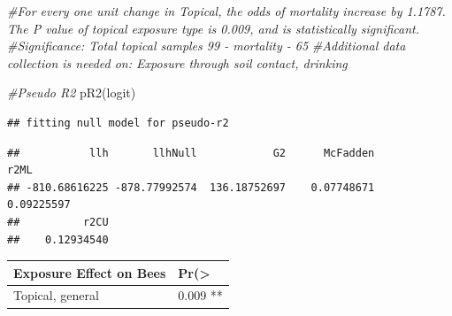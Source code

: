 \documentclass[
  12pt,
]{article}
\newenvironment{Shaded}{\begin{snugshade}}{\end{snugshade}}
\newcommand{\AttributeTok}[1]{\textcolor[rgb]{0.77,0.63,0.00}{#1}}
\newcommand{\CommentTok}[1]{\textcolor[rgb]{0.56,0.35,0.01}{\textit{#1}}}
\newcommand{\DecValTok}[1]{\textcolor[rgb]{0.00,0.00,0.81}{#1}}
\newcommand{\FunctionTok}[1]{\textcolor[rgb]{0.00,0.00,0.00}{#1}}
\newcommand{\NormalTok}[1]{#1}
\newcommand{\OtherTok}[1]{\textcolor[rgb]{0.56,0.35,0.01}{#1}}
\newcommand{\SpecialCharTok}[1]{\textcolor[rgb]{0.00,0.00,0.00}{#1}}
\newcommand{\StringTok}[1]{\textcolor[rgb]{0.31,0.60,0.02}{#1}}
\begin{document}
\begin{Shaded}
\begin{Highlighting}[]
\CommentTok{\#For every one unit change in Topical, the odds of mortality increase by 1.1787. The P value of topical exposure type is 0.009, and is statistically significant.}
\CommentTok{\#Significance: Total topical samples 99 {-} mortality {-} 65}
\CommentTok{\#Additional data collection is needed on: Exposure through soil contact, drinking}

\CommentTok{\#Pseudo R2}
 \FunctionTok{pR2}\NormalTok{(logit)}
\end{Highlighting}
\end{Shaded}

\begin{verbatim}
## fitting null model for pseudo-r2
\end{verbatim}

\begin{verbatim}
##           llh       llhNull            G2      McFadden          r2ML 
## -810.68616225 -878.77992574  136.18752697    0.07748671    0.09225597 
##          r2CU 
##    0.12934540
\end{verbatim}

\begin{longtable}[]{@{}ll@{}}
\toprule
Exposure Effect on Bees & Pr(\textgreater{} \\
\midrule
\endhead
Topical, general & 0.009 ** \\
\bottomrule
\end{longtable}

\begin{Shaded}
\end{Shaded}
\end{document}
